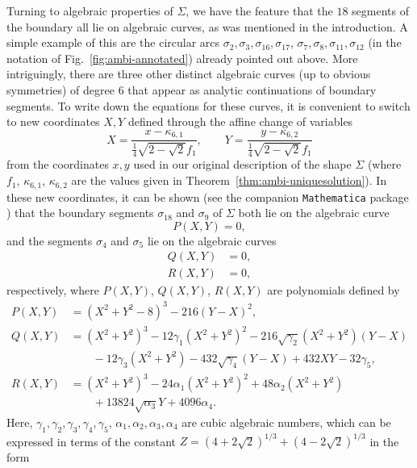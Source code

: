 \documentclass[11pt]{article}
\begin{document}
Turning to algebraic properties of $\Sigma$, we have the feature that the $18$ segments of the boundary all lie on algebraic curves, as was mentioned in the introduction. A simple example of this are the circular arcs $\sigma_2, \sigma_3, \sigma_{16}, \sigma_{17}$, $\sigma_7, \sigma_8, \sigma_{11}, \sigma_{12}$ (in the notation of Fig.~\ref{fig:ambi-annotated}) already pointed out above. More intriguingly, there are three other distinct algebraic curves (up to obvious symmetries) of degree $6$ that appear as analytic continuations of boundary segments. To write down the equations for these curves, it is convenient to switch to new coordinates $X, Y$ defined through the affine change of variables
$$
X = \frac{x-\kappa_{6,1}}{\tfrac14 \sqrt{2-\sqrt{2}} f_1}, 
\qquad
Y = \frac{y-\kappa_{6,2}}{\tfrac14 \sqrt{2-\sqrt{2}} f_1}
$$
from the coordinates $x,y$ used in our original description of the shape $\Sigma$
(where $f_1$, $\kappa_{6,1}$, $\kappa_{6,2}$ are the values given in Theorem~\ref{thm:ambi-uniquesolution}). In these new coordinates, it can be shown (see the companion \texttt{Mathematica} package \cite[Section~13]{romik-sofa-mathematica}) that the boundary segments $\sigma_{18}$ and $\sigma_9$ of $\Sigma$ both lie on the algebraic curve
$$
P(X,Y) = 0,
$$
and the segments $\sigma_4$ and $\sigma_5$ lie on the algebraic curves
\begin{align*}
Q(X,Y) & = 0, \\ 
R(X,Y) & = 0,
\end{align*}
respectively, where $P(X,Y)$, $Q(X,Y)$, $R(X,Y)$ are polynomials defined by
\begin{align*}
P(X,Y) &= 
\left(X^2+Y^2-8\right)^3-216 (Y-X)^2,
\\[5pt]
Q(X,Y) &= 
\left(X^2+Y^2\right)^3
-12 \gamma _1 \left(X^2+Y^2\right)^2
-216 \sqrt{\gamma _2} \left(X^2+Y^2\right) (Y-X)
\\ & \qquad -12 \gamma _3 \left(X^2+Y^2\right)
-432 \sqrt{\gamma _4} (Y-X)
+432 X Y -32 \gamma _5,
\\[5pt]
R(X,Y) &= 
\left(X^2+Y^2\right)^3
-24 \alpha _1 \left(X^2+Y^2\right)^2
+48 \alpha _2 \left(X^2+Y^2\right)
\\ & \qquad +13824 \sqrt{\alpha _3} Y
+4096 \alpha _4.
\end{align*}
Here, $\gamma_1, \gamma_2, \gamma_3, \gamma_4, \gamma_5$, $\alpha_1, \alpha_2, \alpha_3, \alpha_4$ are cubic algebraic numbers, which can be expressed in terms of the constant $Z= (4+2\sqrt{2})^{1/3} + (4-2\sqrt{2})^{1/3}$ in the form
\end{document}

